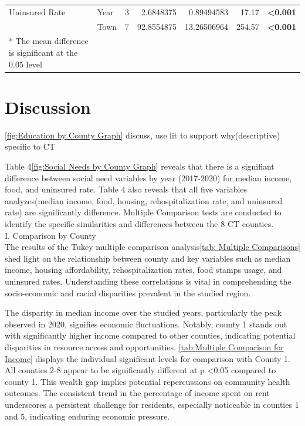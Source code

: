 \documentclass[12pt]{article}
\begin{document}
\begin{table}[]
{\begin{tabular}{llrrrrl}
  Uninsured Rate         & Year                   & 3                               & 2.6848375                                   & 0.89494583                               & 17.17                                & \textbf{\textless0.001}                     \\
                         & Town                   & 7                               & 92.8554875                                  & 13.26506964                              & 254.57                               & \textbf{\textless0.001}    \\                
  * The mean difference is significant at the 0.05 level\\
  \end{tabular}%
  }
  \end{table}

\section{Discussion}\label{sec:disc}

\ref{fig:Education by County Graph}
discuss, use lit to support why(descriptive) specific to CT


Table 4\ref{fig:Social Needs by County Graph} reveals that there is a signifiant difference between 
social need variables by year (2017-2020) for median income, food, and uninsured rate. Table 4 also 
reveals that all five variables analyzes(median income, food, housing, rehospitalization rate, and 
uninsured rate) are significantly difference. Multiple Comparison tests are conducted to identify the 
specific similarities and differences between the 8 CT counties.
\\
I. Comparison by County
\\
The results of the Tukey multiple comparison analysis\ref{tab: Multiple Comparisons} shed light on the relationship between county and key 
variables such as median income, housing affordability, rehospitalization rates, food stamps usage, and
uninsured rates. Understanding these correlations is vital in comprehending 
the socio-economic and racial disparities prevalent in the studied region.

The disparity in median income over the studied years, particularly the peak observed in 2020, 
signifies economic fluctuations. Notably, county 1 stands out with significantly higher income 
compared to other counties, indicating potential disparities in resource access and opportunities. 
\ref{tab:Multiple Comparison for Income} displays the individual significant levels for comparison with County 1.
All counties 2-8 appear to be significantly different at p <0.05 compared to county 1.
This wealth gap implies potential repercussions on community health outcomes. The consistent trend in 
the percentage of income spent on rent underscores a persistent challenge for residents, especially 
noticeable in counties 1 and 5, indicating enduring economic pressure.
\end{document}
